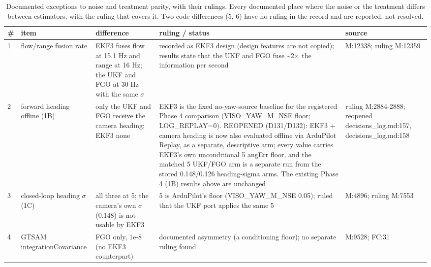 \begin{table}[htbp]
\centering
\scriptsize
\caption{Documented exceptions to noise and treatment parity, with their rulings. Every documented place where the noise or the treatment differs between estimators, with the ruling that covers it. Two code differences (5, 6) have no ruling in the record and are reported, not resolved.}
\label{tab:methods_noise_exceptions}
\begin{tabular}{p{}p{}p{}p{}p{}}
\toprule
\textbf{\#} & \textbf{item} & \textbf{difference} & \textbf{ruling / status} & \textbf{source} \\
\midrule
1 & flow/range fusion rate & EKF3 fuses flow at 15.1 Hz and range at 16 Hz; the UKF and FGO at 30 Hz with the same $\sigma$ & recorded as EKF3 design (design features are not copied); results state that the UKF and FGO fuse \textasciitilde{}2$\times$ the information per second & M:12338; ruling M:12359 \\
2 & forward heading offline (1B) & only the UKF and FGO receive the camera heading; EKF3 none & EKF3 is the fixed no-yaw-source baseline for the registered Phase 4 comparison (VISO\_YAW\_M\_NSE floor; LOG\_REPLAY=0). REOPENED (D131/D132): EKF3 + camera heading is now also evaluated offline via ArduPilot Replay, as a separate, descriptive arm; every value carries EKF3's own unconditional 5\textdegree{} angErr floor, and the matched 5\textdegree{} UKF/FGO arm is a separate run from the stored 0.148\textdegree{}/0.126\textdegree{} heading-sigma arms. The existing Phase 4 (1B) results above are unchanged & ruling M:2884-2888; reopened decisions\_log.md:157, decisions\_log.md:158 \\
3 & closed-loop heading $\sigma$ (1C) & all three at 5\textdegree{}; the camera's own $\sigma$ (0.148\textdegree{}) is not usable by EKF3 & 5\textdegree{} is ArduPilot's floor (VISO\_YAW\_M\_NSE 0.05); ruled that the UKF port applies the same 5\textdegree{} & M:4896; ruling M:7553 \\
4 & GTSAM integrationCovariance & FGO only, 1e-8 (no EKF3 counterpart) & documented asymmetry (a conditioning floor); no separate ruling found & M:9528; FC:31 \\

\end{tabular}
\end{table}
